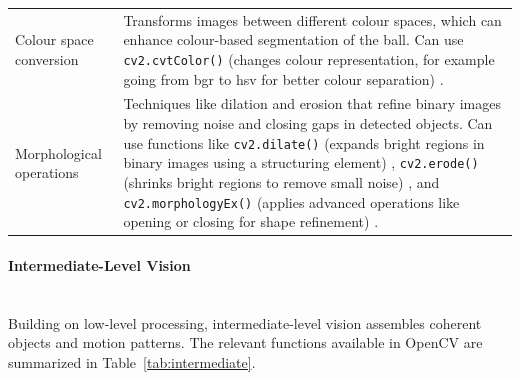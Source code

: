 \documentclass[12pt,a4paper]{article}
\begin{document}
\begin{longtable}{@{}l p{}@{}}
	Colour space conversion & Transforms images between different colour spaces, which can enhance colour-based segmentation of the ball. Can use \texttt{cv2.cvtColor()} (changes colour representation, for example going from \acs{bgr} to \acs{hsv} for better colour separation) \parencite{opencv_color}. \\
	
	Morphological operations & Techniques like dilation and erosion that refine binary images by removing noise and closing gaps in detected objects. Can use functions like \texttt{cv2.dilate()} (expands bright regions in binary images using a structuring element) \parencite{opencv_dilate}, \texttt{cv2.erode()} (shrinks bright regions to remove small noise) \parencite{opencv_erode}, and \texttt{cv2.morphologyEx()} (applies advanced operations like opening or closing for shape refinement) \parencite{opencv_morphologyex}. \\
	\bottomrule
\end{longtable}

\paragraph{Intermediate-Level Vision}
\mbox{}\\
Building on low-level processing, intermediate-level vision assembles coherent objects and motion patterns. The relevant functions available in OpenCV are summarized in Table~\ref{tab:intermediate}.
\end{document}
